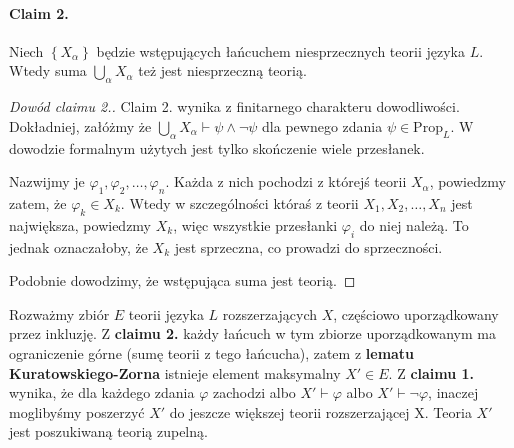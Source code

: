 \paragraph{Claim 2.} Niech \( \left\{ X_\alpha \right\} \) będzie wstępujących łańcuchem niesprzecznych teorii języka \( L \). Wtedy suma \( \bigcup_\alpha X_\alpha \) też jest niesprzeczną teorią.

\begin{proof}[Dowód claimu 2.]
    Claim 2. wynika z finitarnego charakteru dowodliwości. Dokładniej, załóżmy że \( \bigcup_\alpha X_\alpha \vdash \psi \wedge \neg \psi \) dla pewnego zdania \( \psi \in \mathrm{Prop}_L \). W dowodzie formalnym użytych jest tylko skończenie wiele przesłanek.

    Nazwijmy je \( \varphi_1, \varphi_2, \ldots, \varphi_n \). Każda z nich pochodzi z którejś teorii \( X_\alpha \), powiedzmy zatem, że \( \varphi_k \in X_k \). Wtedy w szczególności któraś z teorii \( X_1, X_2, \ldots, X_n \) jest największa, powiedzmy \( X_k \), więc wszystkie przesłanki \( \varphi_i \) do niej należą. To jednak oznaczałoby, że \( X_k \) jest sprzeczna, co prowadzi do sprzeczności.

    Podobnie dowodzimy, że wstępująca suma jest teorią.
\end{proof}

Rozważmy zbiór \( E \) teorii języka \( L \) rozszerzających \( X \), częściowo uporządkowany przez inkluzję. Z \textbf{claimu 2.} każdy łańcuch w tym zbiorze uporządkowanym ma ograniczenie górne (sumę teorii z tego łańcucha), zatem z \textbf{lematu Kuratowskiego-Zorna} istnieje element maksymalny \( X' \in E \). Z \textbf{claimu 1.} wynika, że dla każdego zdania \( \varphi \) zachodzi albo \( X' \vdash \varphi \) albo \( X' \vdash \neg\varphi \), inaczej moglibyśmy poszerzyć \( X' \) do jeszcze większej teorii rozszerzającej X. Teoria \( X' \) jest poszukiwaną teorią zupelną.
